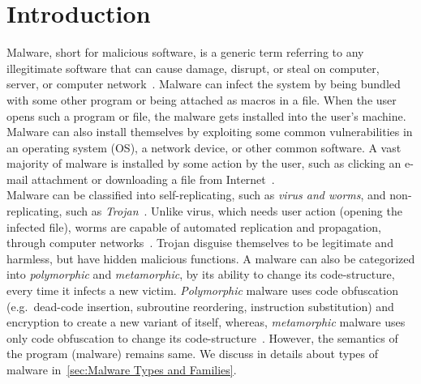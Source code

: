 \chapter{Introduction}\label{chapter:introduction}
Malware, short for malicious software, is a generic term referring to any illegitimate software that can cause damage, disrupt, or steal on computer, server, or computer network~\cite[]{ciscodif}.
Malware can infect the system by being bundled with some other program or being attached as macros in a file.
When the user opens such a program or file, the malware gets installed into the user's machine.
Malware can also install themselves by exploiting some common vulnerabilities in an operating system (OS), a network device, or other common software.
A vast majority of malware is installed by some action by the user, such as clicking an e-mail attachment or downloading a file from Internet~\cite[]{ciscodif}.\\
Malware can be classified into self-replicating, such as \emph{virus and worms}, and non-replicating, such as \emph{Trojan}~\cite[]{malsoft}.
Unlike virus, which needs user action (opening the infected file), worms are capable of automated replication and propagation, through computer networks~\cite[]{malsoft}.
Trojan disguise themselves to be legitimate and harmless, but have hidden malicious functions.
A malware can also be categorized into \emph{polymorphic} and \emph{metamorphic}, by its ability to change its code-structure, every time it infects a new victim.
\emph{Polymorphic} malware uses code obfuscation (e.g.\ dead-code insertion, subroutine reordering, instruction substitution) and encryption to create a new variant of itself, whereas,
\emph{metamorphic} malware uses only code obfuscation to change its code-structure~\cite[]{rad2011evolution,rad2012camouflage}.
However, the semantics of the program (malware) remains same.
We discuss in details about types of malware in~\autoref{sec:Malware Types and Families}.\\
